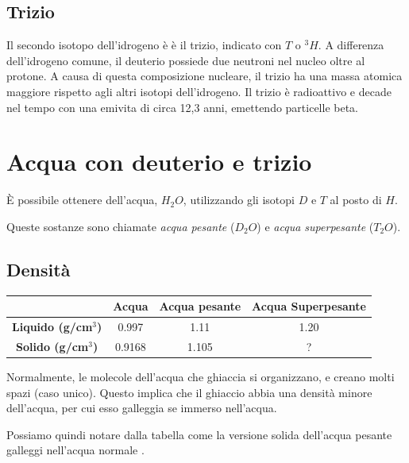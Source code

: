 \documentclass[a4paper]{article}
\begin{document}
\subsection{Trizio}

Il secondo isotopo dell'idrogeno è è il trizio, indicato con \(T\) o \(^3H\).
A differenza dell'idrogeno comune, il deuterio possiede due neutroni nel nucleo oltre al protone.
A causa di questa composizione nucleare, il trizio ha una massa atomica maggiore rispetto agli altri isotopi dell'idrogeno.
Il trizio è radioattivo e decade nel tempo con una emivita di circa 12,3 anni, emettendo particelle beta.

\section{Acqua con deuterio e trizio}

È possibile ottenere dell'acqua, \(H_2O\), utilizzando gli isotopi \(D\) e \(T\) al posto di \(H\).

Queste sostanze sono chiamate \textit{acqua pesante} (\(D_2O\)) e
\textit{acqua superpesante} (\(T_2O\)).

\subsection{Densità}

\begin{center}
    \bgroup{}
    \def\arraystretch{1.25}
    \begin{tabular}{ |c|c|c|c| }
        \hline
        & \textbf{Acqua} & \textbf{Acqua pesante} & \textbf{Acqua Superpesante} \\
        \hline
        \textbf{Liquido (g/cm\(^3\))} & 0.997 & 1.11 & 1.20 \\
        \hline
        \textbf{Solido (g/cm\(^3\))} & 0.9168 & 1.105 & ? \\
        \hline
    \end{tabular}
    \egroup{}
\end{center}

Normalmente, le molecole dell'acqua che ghiaccia si organizzano, e creano molti spazi (caso unico).
Questo implica che il ghiaccio abbia una densità minore dell'acqua, per cui esso galleggia se immerso nell'acqua.

Possiamo quindi notare dalla tabella come la versione solida dell'acqua pesante galleggi
nell'acqua normale \cite{deuterated-water}.

\nocite{*} %

\printbibliography

\end{document}
